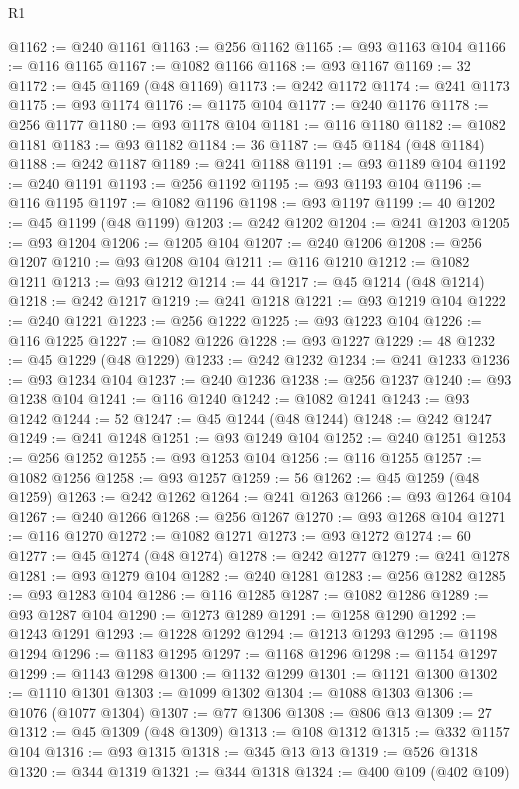 \begin{lexlean}{R1}
\begin{coremodule}
@1162 := @240 @1161
@1163 := @256 @1162
@1165 := @93 @1163 @104
@1166 := @116 @1165
@1167 := @1082 @1166
@1168 := @93 @1167
@1169 := 32
@1172 := @45 @1169 (@48 @1169)
@1173 := @242 @1172
@1174 := @241 @1173
@1175 := @93 @1174
@1176 := @1175 @104
@1177 := @240 @1176
@1178 := @256 @1177
@1180 := @93 @1178 @104
@1181 := @116 @1180
@1182 := @1082 @1181
@1183 := @93 @1182
@1184 := 36
@1187 := @45 @1184 (@48 @1184)
@1188 := @242 @1187
@1189 := @241 @1188
@1191 := @93 @1189 @104
@1192 := @240 @1191
@1193 := @256 @1192
@1195 := @93 @1193 @104
@1196 := @116 @1195
@1197 := @1082 @1196
@1198 := @93 @1197
@1199 := 40
@1202 := @45 @1199 (@48 @1199)
@1203 := @242 @1202
@1204 := @241 @1203
@1205 := @93 @1204
@1206 := @1205 @104
@1207 := @240 @1206
@1208 := @256 @1207
@1210 := @93 @1208 @104
@1211 := @116 @1210
@1212 := @1082 @1211
@1213 := @93 @1212
@1214 := 44
@1217 := @45 @1214 (@48 @1214)
@1218 := @242 @1217
@1219 := @241 @1218
@1221 := @93 @1219 @104
@1222 := @240 @1221
@1223 := @256 @1222
@1225 := @93 @1223 @104
@1226 := @116 @1225
@1227 := @1082 @1226
@1228 := @93 @1227
@1229 := 48
@1232 := @45 @1229 (@48 @1229)
@1233 := @242 @1232
@1234 := @241 @1233
@1236 := @93 @1234 @104
@1237 := @240 @1236
@1238 := @256 @1237
@1240 := @93 @1238 @104
@1241 := @116 @1240
@1242 := @1082 @1241
@1243 := @93 @1242
@1244 := 52
@1247 := @45 @1244 (@48 @1244)
@1248 := @242 @1247
@1249 := @241 @1248
@1251 := @93 @1249 @104
@1252 := @240 @1251
@1253 := @256 @1252
@1255 := @93 @1253 @104
@1256 := @116 @1255
@1257 := @1082 @1256
@1258 := @93 @1257
@1259 := 56
@1262 := @45 @1259 (@48 @1259)
@1263 := @242 @1262
@1264 := @241 @1263
@1266 := @93 @1264 @104
@1267 := @240 @1266
@1268 := @256 @1267
@1270 := @93 @1268 @104
@1271 := @116 @1270
@1272 := @1082 @1271
@1273 := @93 @1272
@1274 := 60
@1277 := @45 @1274 (@48 @1274)
@1278 := @242 @1277
@1279 := @241 @1278
@1281 := @93 @1279 @104
@1282 := @240 @1281
@1283 := @256 @1282
@1285 := @93 @1283 @104
@1286 := @116 @1285
@1287 := @1082 @1286
@1289 := @93 @1287 @104
@1290 := @1273 @1289
@1291 := @1258 @1290
@1292 := @1243 @1291
@1293 := @1228 @1292
@1294 := @1213 @1293
@1295 := @1198 @1294
@1296 := @1183 @1295
@1297 := @1168 @1296
@1298 := @1154 @1297
@1299 := @1143 @1298
@1300 := @1132 @1299
@1301 := @1121 @1300
@1302 := @1110 @1301
@1303 := @1099 @1302
@1304 := @1088 @1303
@1306 := @1076 (@1077 @1304)
@1307 := @77 @1306
@1308 := @806 @13
@1309 := 27
@1312 := @45 @1309 (@48 @1309)
@1313 := @108 @1312
@1315 := @332 @1157 @104
@1316 := @93 @1315
@1318 := @345 @13 @13
@1319 := @526 @1318
@1320 := @344 @1319
@1321 := @344 @1318
@1324 := @400 @109 (@402 @109)

\end{coremodule}
\end{lexlean}
